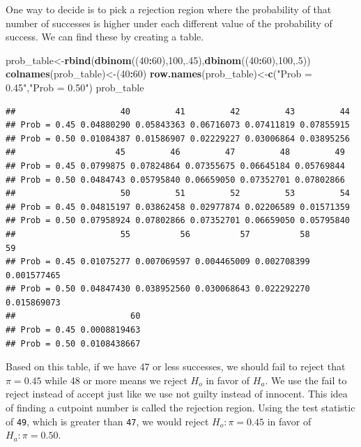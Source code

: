 \documentclass[]{book}
\newenvironment{Shaded}{\begin{snugshade}}{\end{snugshade}}
\newcommand{\KeywordTok}[1]{\textcolor[rgb]{0.13,0.29,0.53}{\textbf{#1}}}
\newcommand{\DecValTok}[1]{\textcolor[rgb]{0.00,0.00,0.81}{#1}}
\newcommand{\StringTok}[1]{\textcolor[rgb]{0.31,0.60,0.02}{#1}}
\newcommand{\OperatorTok}[1]{\textcolor[rgb]{0.81,0.36,0.00}{\textbf{#1}}}
\newcommand{\NormalTok}[1]{#1}
\theoremstyle{definition}
\theoremstyle{definition}
\theoremstyle{definition}
\theoremstyle{remark}
\begin{document}
One way to decide is to pick a rejection region where the probability of
that number of successes is higher under each different value of the
probability of success. We can find these by creating a table.

\begin{Shaded}
\begin{Highlighting}[]
\NormalTok{prob_table<-}\KeywordTok{rbind}\NormalTok{(}\KeywordTok{dbinom}\NormalTok{((}\DecValTok{40}\OperatorTok{:}\DecValTok{60}\NormalTok{),}\DecValTok{100}\NormalTok{,.}\DecValTok{45}\NormalTok{),}\KeywordTok{dbinom}\NormalTok{((}\DecValTok{40}\OperatorTok{:}\DecValTok{60}\NormalTok{),}\DecValTok{100}\NormalTok{,.}\DecValTok{5}\NormalTok{))}
\KeywordTok{colnames}\NormalTok{(prob_table)<-(}\DecValTok{40}\OperatorTok{:}\DecValTok{60}\NormalTok{)}
\KeywordTok{row.names}\NormalTok{(prob_table)<-}\KeywordTok{c}\NormalTok{(}\StringTok{"Prob = 0.45"}\NormalTok{,}\StringTok{"Prob = 0.50"}\NormalTok{)}
\NormalTok{prob_table}
\end{Highlighting}
\end{Shaded}

\begin{verbatim}
##                     40         41         42         43         44
## Prob = 0.45 0.04880290 0.05843363 0.06716073 0.07411819 0.07855915
## Prob = 0.50 0.01084387 0.01586907 0.02229227 0.03006864 0.03895256
##                    45         46         47         48         49
## Prob = 0.45 0.0799875 0.07824864 0.07355675 0.06645184 0.05769844
## Prob = 0.50 0.0484743 0.05795840 0.06659050 0.07352701 0.07802866
##                     50         51         52         53         54
## Prob = 0.45 0.04815197 0.03862458 0.02977874 0.02206589 0.01571359
## Prob = 0.50 0.07958924 0.07802866 0.07352701 0.06659050 0.05795840
##                     55          56          57          58          59
## Prob = 0.45 0.01075277 0.007069597 0.004465009 0.002708399 0.001577465
## Prob = 0.50 0.04847430 0.038952560 0.030068643 0.022292270 0.015869073
##                       60
## Prob = 0.45 0.0008819463
## Prob = 0.50 0.0108438667
\end{verbatim}

Based on this table, if we have 47 or less successes, we should fail to
reject that \(\pi = 0.45\) while 48 or more means we reject \(H_{o}\) in
favor of \(H_{a}\). We use the fail to reject instead of accept just
like we use not guilty instead of innocent. This idea of finding a
cutpoint number is called the rejection region. Using the test statistic
of \texttt{49}, which is greater than \texttt{47}, we would reject
\(H_{o}: \pi = 0.45\) in favor of \(H_{a}: \pi = 0.50\).
\end{document}
